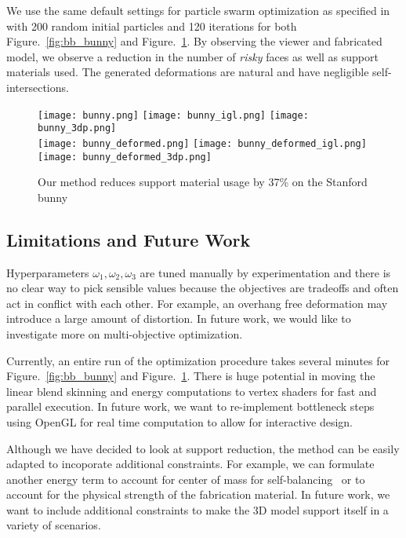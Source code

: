 We use the same default settings for particle swarm optimization as specified in \cite{jacobson_matryoshka_2017} with 200 random initial particles and 120 iterations for both Figure.~\ref{fig:bb_bunny} and Figure.~\ref{fig:bunny}. By observing the viewer and fabricated model, we observe a reduction in the number of \textit{risky} faces as well as support materials used. The generated deformations are natural and have negligible self-intersections.

\begin{figure}[ht]
    \centering
    \texttt{[image: bunny.png]}
    \texttt{[image: bunny\_igl.png]} 
    \texttt{[image: bunny\_3dp.png]}
    \\
    \texttt{[image: bunny\_deformed.png]} 
    \texttt{[image: bunny\_deformed\_igl.png]} 
    \texttt{[image: bunny\_deformed\_3dp.png]}
    \caption{Our method reduces support material usage by 37\% on the Stanford bunny}
    \label{fig:bunny}
\end{figure}


\subsection*{Limitations and Future Work}

Hyperparameters $\omega_1, \omega_2, \omega_3$ are tuned manually by experimentation and there is no clear way to pick sensible values because the objectives are tradeoffs and often act in conflict with each other. For example, an overhang free deformation may introduce a large amount of distortion. In future work, we would like to investigate more on multi-objective optimization.

Currently, an entire run of the optimization procedure takes several minutes for Figure.~\ref{fig:bb_bunny} and Figure.~\ref{fig:bunny}. There is huge potential in moving the linear blend skinning and energy computations to vertex shaders for fast and parallel execution. In future work, we want to re-implement bottleneck steps using OpenGL for real time computation to allow for interactive design.

Although we have decided to look at support reduction, the method can be easily adapted to incoporate additional constraints. For example, we can formulate another energy term to account for center of mass for self-balancing~\cite{make_it_stand_2013} or to account for the physical strength of the fabrication material. In future work, we want to include additional constraints to make the 3D model support itself in a variety of scenarios.